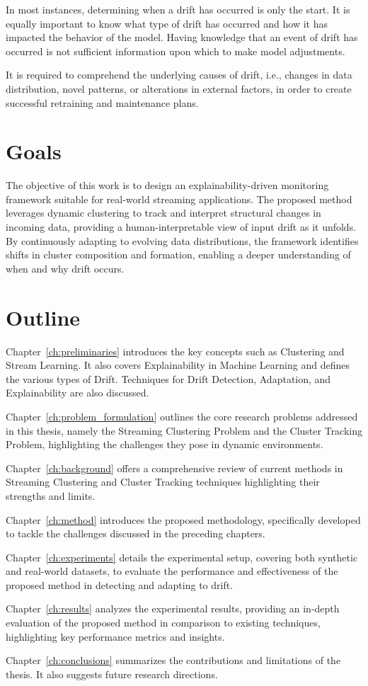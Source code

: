 In most instances, determining when a drift has occurred is only the start. It
is equally important to know what type of drift has occurred and how it has
impacted the behavior of the model. Having knowledge that an event of drift has
occurred is not sufficient information upon which to make model adjustments.

It is required to comprehend the underlying causes of drift, i.e., changes in
data distribution, novel patterns, or alterations in external factors, in order
to create successful retraining and maintenance plans.

\section{Goals}\label{sec:goal}
The objective of this work is to design an explainability-driven monitoring framework
suitable for real-world streaming applications. The proposed method leverages dynamic
clustering to track and interpret structural changes in incoming data, providing a
human-interpretable view of input drift as it unfolds. By continuously adapting to
evolving data distributions, the framework identifies shifts in cluster composition
and formation, enabling a deeper understanding of when and why drift occurs.

\section{Outline}\label{sec:outline}
Chapter~\ref{ch:preliminaries} introduces the key concepts such as Clustering and
Stream Learning. It also covers Explainability in Machine Learning and defines the
various types of Drift. Techniques for Drift Detection, Adaptation, and Explainability
are also discussed.

Chapter~\ref{ch:problem_formulation} outlines the core research problems
addressed in this thesis, namely the Streaming Clustering Problem and the
Cluster Tracking Problem, highlighting the challenges they pose in dynamic
environments.

Chapter~\ref{ch:background} offers a comprehensive review of current methods in
Streaming Clustering and Cluster Tracking techniques highlighting their
strengths and limits.

Chapter~\ref{ch:method} introduces the proposed methodology, specifically
developed to tackle the challenges discussed in the preceding chapters.

Chapter~\ref{ch:experiments} details the experimental setup, covering both
synthetic and real-world datasets, to evaluate the performance and
effectiveness of the proposed method in detecting and adapting to drift.

Chapter~\ref{ch:results} analyzes the experimental results, providing an
in-depth evaluation of the proposed method in comparison to existing
techniques, highlighting key performance metrics and insights.

Chapter~\ref{ch:conclusions} summarizes the contributions and limitations of
the thesis. It also suggests future research directions.